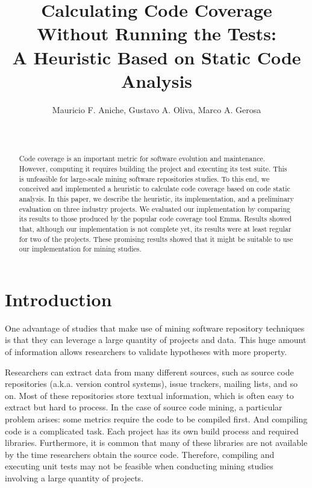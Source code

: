 \documentclass{sig-alternate}
\begin{document}

\title{Calculating Code Coverage Without Running the Tests:\\
A Heuristic Based on Static Code Analysis}

\author{
\alignauthor
Mauricio F. Aniche, Gustavo A. Oliva, Marco A. Gerosa\\
\\
\\
}

\maketitle
\begin{abstract}

Code coverage is an important metric for software evolution and maintenance.
However, computing it requires building the project and executing its test suite.
This is unfeasible for large-scale mining software repositories studies. To this end,
we conceived and implemented a heuristic to calculate code coverage based on 
code static analysis. In this paper, we describe the heuristic, its implementation, 
and a preliminary evaluation on three industry projects. We evaluated our implementation by 
comparing its results to those produced by the popular code coverage tool Emma. Results showed that, 
although our implementation is not complete yet, its results were at least regular for two of the projects. 
These promising results showed that it might be suitable to use our implementation for mining studies.


\end{abstract}

\section{Introduction}
\label{sec:intro}

One advantage of studies that make use of mining software repository techniques
is that they can leverage a large quantity of projects and data. This huge
amount of information allows researchers to validate hypotheses with more property.

Researchers can extract data from many different sources, 
such as source code repositories (a.k.a. version control systems), 
issue trackers, mailing lists, and so on. Most of these repositories 
store textual information, which is often easy to extract but hard to process. 
In the case of source code mining, a particular problem arises: some metrics 
require the code to be compiled first. And compiling code is a complicated task. 
Each project has its own build process and required libraries. Furthermore, 
it is common that many of these libraries are not available by the time 
researchers obtain the source code. Therefore, compiling and executing 
unit tests may not be feasible when conducting mining studies involving a large
quantity of projects.
\end{document}
